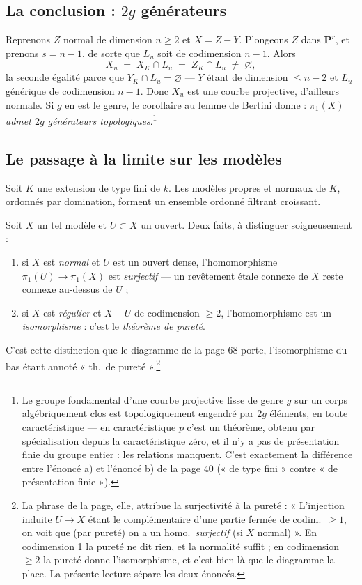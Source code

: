 \documentclass[11pt,a4paper]{article}
\begin{document}
\subsection*{La conclusion : $2g$ générateurs}

Reprenons $Z$ normal de dimension $n \geqslant 2$ et $X = Z - Y$. Plongeons $Z$
dans $\mathbf{P}^{r}$, et prenons $s = n-1$, de sorte que $L_{u}$ soit de
codimension $n-1$. Alors
\[
  X_{u} \;=\; X_{K} \cap L_{u} \;=\; Z_{K} \cap L_{u} \;\neq\; \varnothing ,
\]
la seconde égalité parce que $Y_{K} \cap L_{u} = \varnothing$ --- $Y$ étant de
dimension $\leqslant n-2$ et $L_{u}$ générique de codimension $n-1$. Donc
$X_{u}$ est une courbe projective, d'ailleurs normale. Si $g$ en est le genre,
le corollaire au lemme de Bertini donne : \emph{$\pi_{1}(X)$ admet $2g$
générateurs topologiques}.\footnote{Le groupe fondamental d'une courbe
projective lisse de genre $g$ sur un corps algébriquement clos est
topologiquement engendré par $2g$ éléments, en toute caractéristique ---
en caractéristique $p$ c'est un théorème, obtenu par spécialisation depuis la
caractéristique zéro, et il n'y a pas de présentation finie du groupe entier :
les relations manquent. C'est exactement la différence entre l'énoncé a) et
l'énoncé b) de la page 40 (« de type fini » contre « de présentation finie »).}

\subsection*{Le passage à la limite sur les modèles}

Soit $K$ une extension de type fini de $k$. Les modèles propres et normaux de
$K$, ordonnés par domination, forment un ensemble ordonné filtrant croissant.

Soit $X$ un tel modèle et $U \subset X$ un ouvert. Deux faits, à distinguer
soigneusement :

\begin{enumerate}
  \item si $X$ est \emph{normal} et $U$ est un ouvert dense, l'homomorphisme
    $\pi_{1}(U) \to \pi_{1}(X)$ est \emph{surjectif} --- un revêtement étale
    connexe de $X$ reste connexe au-dessus de $U$ ;
  \item si $X$ est \emph{régulier} et $X - U$ de codimension $\geqslant 2$,
    l'homomorphisme est un \emph{isomorphisme} : c'est le \emph{théorème de
    pureté}.
\end{enumerate}

C'est cette distinction que le diagramme de la page 68 porte, l'isomorphisme du
bas étant annoté « th.\ de pureté ».\footnote{La phrase de la page, elle,
attribue la surjectivité à la pureté : « L'injection induite $U \to X$ étant le
complémentaire d'une partie fermée de codim.\ $\geqslant 1$, on voit que (par
pureté) on a un homo.\ \emph{surjectif} (si $X$ normal) ». En codimension 1 la
pureté ne dit rien, et la normalité suffit ; en codimension $\geqslant 2$ la
pureté donne l'isomorphisme, et c'est bien là que le diagramme la place. La
présente lecture sépare les deux énoncés.}
\end{document}
